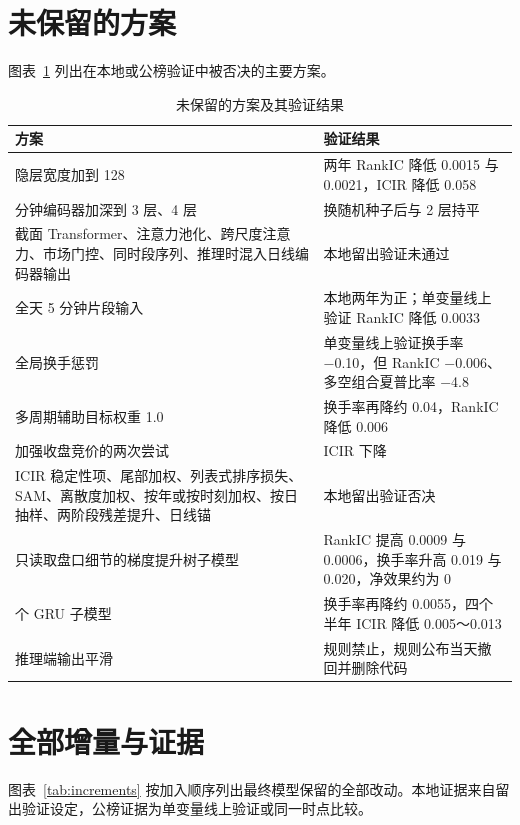 \documentclass[UTF8,a4paper,zihao=-4,fontset=none]{ctexart}
\newcommand{\tabsetup}{\small\linespread{1.15}\selectfont\renewcommand{\arraystretch}{1.25}}
\newcommand{\figref}[1]{图表~\ref{#1}}
\begin{document}
\section{未保留的方案}\label{app:rejected}

\figref{tab:rejected} 列出在本地或公榜验证中被否决的主要方案。

\begin{table}[htbp]
\caption{未保留的方案及其验证结果}\label{tab:rejected}
\centering\tabsetup
\begin{tabularx}{\textwidth}{@{}>{\raggedright\arraybackslash\hsize=1.0\hsize}X>{\raggedright\arraybackslash\hsize=1.0\hsize}X@{}}
\toprule
方案 & 验证结果\\
\midrule
隐层宽度加到 128 & 两年 RankIC 降低 0.0015 与 0.0021，ICIR 降低 0.058\\
1 分钟编码器加深到 3 层、4 层 & 换随机种子后与 2 层持平\\
截面 Transformer、注意力池化、跨尺度注意力、市场门控、同时段序列、推理时混入日线编码器输出 & 本地留出验证未通过\\
全天 5 分钟片段输入 & 本地两年为正；单变量线上验证 RankIC 降低 0.0033\\
全局换手惩罚 & 单变量线上验证换手率 −0.10，但 RankIC −0.006、多空组合夏普比率 −4.8\\
多周期辅助目标权重 1.0 & 换手率再降约 0.04，RankIC 降低 0.006\\
加强收盘竞价的两次尝试 & ICIR 下降\\
ICIR 稳定性项、尾部加权、列表式排序损失、SAM、离散度加权、按年或按时刻加权、按日抽样、两阶段残差提升、日线锚 & 本地留出验证否决\\
只读取盘口细节的梯度提升树子模型 & RankIC 提高 0.0009 与 0.0006，换手率升高 0.019 与 0.020，净效果约为 0\\
4 个 GRU 子模型 & 换手率再降约 0.0055，四个半年 ICIR 降低 0.005～0.013\\
推理端输出平滑 & 规则禁止，规则公布当天撤回并删除代码\\
\bottomrule
\end{tabularx}
\end{table}

\section{全部增量与证据}\label{app:increments}

\figref{tab:increments} 按加入顺序列出最终模型保留的全部改动。本地证据来自留出验证设定，公榜证据为单变量线上验证或同一时点比较。
\end{document}
